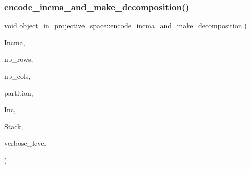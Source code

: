 \mbox{\label{classobject__in__projective__space_a8f0ebd9ca15ecfeb61480cb884888444}} 
\subsubsection{\texorpdfstring{encode\+\_\+incma\+\_\+and\+\_\+make\+\_\+decomposition()}{encode\_incma\_and\_make\_decomposition()}}
{\footnotesize\ttfamily void object\+\_\+in\+\_\+projective\+\_\+space\+::encode\+\_\+incma\+\_\+and\+\_\+make\+\_\+decomposition (\begin{DoxyParamCaption}\item[{\mbox{\hyperlink{galois_8h_a09fddde158a3a20bd2dcadb609de11dc}{I\+NT}} $\ast$\&}]{Incma,  }\item[{\mbox{\hyperlink{galois_8h_a09fddde158a3a20bd2dcadb609de11dc}{I\+NT}} \&}]{nb\+\_\+rows,  }\item[{\mbox{\hyperlink{galois_8h_a09fddde158a3a20bd2dcadb609de11dc}{I\+NT}} \&}]{nb\+\_\+cols,  }\item[{\mbox{\hyperlink{galois_8h_a09fddde158a3a20bd2dcadb609de11dc}{I\+NT}} $\ast$\&}]{partition,  }\item[{\mbox{\hyperlink{classincidence__structure}{incidence\+\_\+structure}} $\ast$\&}]{Inc,  }\item[{\mbox{\hyperlink{classpartitionstack}{partitionstack}} $\ast$\&}]{Stack,  }\item[{\mbox{\hyperlink{galois_8h_a09fddde158a3a20bd2dcadb609de11dc}{I\+NT}}}]{verbose\+\_\+level }\end{DoxyParamCaption})}

\mbox{\label{classobject__in__projective__space_a52130fa2cd6c2fa65a7add526a260e5d}} 
